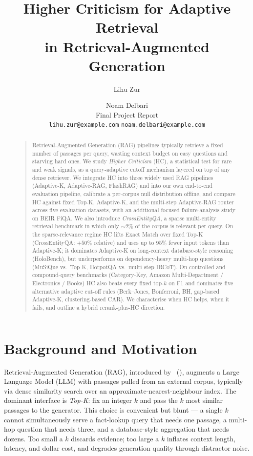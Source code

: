 \documentclass[letterpaper]{article}
\title{Higher Criticism for Adaptive Retrieval\\in Retrieval-Augmented Generation}
\author{Lihu Zur \and Noam Delbari\\
Final Project Report\\
\texttt{lihu.zur@example.com} \quad \texttt{noam.delbari@example.com}\\
}
\begin{document}
\maketitle

\begin{abstract}
\begin{quote}
Retrieval-Augmented Generation (RAG) pipelines typically retrieve a
fixed number of passages per query, wasting context budget on easy
questions and starving hard ones. We study \emph{Higher Criticism}
(HC), a statistical test for rare and weak signals, as a
query-adaptive cutoff mechanism layered on top of any dense retriever.
We integrate HC into three widely used RAG pipelines (Adaptive-K,
Adaptive-RAG, FlashRAG) and into our own end-to-end evaluation
pipeline, calibrate a per-corpus null distribution offline, and
compare HC against fixed Top-K, Adaptive-K, and the multi-step
Adaptive-RAG router across five evaluation datasets, with an
additional focused failure-analysis study on BEIR FiQA. We also
introduce \emph{CrossEntityQA}, a sparse multi-entity retrieval
benchmark in which only $\sim$2\% of the corpus is relevant per query.
On the sparse-relevance regime HC lifts Exact Match over fixed
Top-K (CrossEntityQA: $+50\%$ relative) and uses up to $95\%$ fewer
input tokens than Adaptive-K; it dominates Adaptive-K on long-context
database-style reasoning (HoloBench), but underperforms on
dependency-heavy multi-hop questions (MuSiQue vs.\ Top-K, HotpotQA
vs.\ multi-step IRCoT). On controlled and compound-query benchmarks
(Category-Key, Amazon Multi-Department / Electronics / Books) HC
also beats every fixed top-$k$ on F1 and dominates five alternative
adaptive cut-off rules (Berk--Jones, Bonferroni, BH, gap-based
Adaptive-K, clustering-based CAR). We characterise when HC helps,
when it fails, and outline a hybrid rerank-plus-HC direction.
\end{quote}
\end{abstract}

\section{Background and Motivation}

Retrieval-Augmented Generation (RAG), introduced by
\citeauthor{lewis2020rag}~(\citeyear{lewis2020rag}), augments a Large
Language Model (LLM) with passages pulled from an external corpus,
typically via dense similarity search over an
approximate-nearest-neighbour index. The
dominant interface is \emph{Top-K}: fix an integer $k$ and pass the
$k$ most similar passages to the generator. This choice is convenient
but blunt --- a single $k$ cannot simultaneously serve a fact-lookup
query that needs one passage, a multi-hop question that needs three,
and a database-style aggregation that needs dozens. Too small a $k$
discards evidence; too large a $k$ inflates context length, latency,
and dollar cost, and degrades generation quality through distractor
noise.
\end{document}
